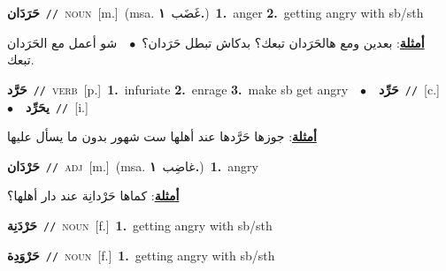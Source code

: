 \documentclass[10pt,a4paper,twoside]{article} %
\begin{document}
\begin{multicols}{2}
{\setlength\topsep{0pt}\textbf{\foreignlanguage{arabic}{حَرَدَان}}\ {\color{gray}\texttt{//}\color{black}}\ \textsc{noun}\ [m.]\ \color{gray}(msa. \foreignlanguage{arabic}{غَضَب}~\foreignlanguage{arabic}{\textbf{١.}})\color{black}\ \textbf{1.}~anger  \textbf{2.}~getting angry with sb/sth\  \begin{flushright}\color{gray}\foreignlanguage{arabic}{\textbf{\underline{\foreignlanguage{arabic}{أمثلة}}}: بعدين ومع هالحَرَدان تبعك؟ بدكاش تبطل حَرَدان؟\ $\bullet$\ \  شو أعمل مع الحَرَدان تبعك.}\end{flushright}\color{black}} \vspace{2mm}

{\setlength\topsep{0pt}\textbf{\foreignlanguage{arabic}{حَرَّد}}\ {\color{gray}\texttt{//}\color{black}}\ \textsc{verb}\ [p.]\ \textbf{1.}~infuriate  \textbf{2.}~enrage  \textbf{3.}~make sb get angry\ \ $\bullet$\ \ \setlength\topsep{0pt}\textbf{\foreignlanguage{arabic}{حَرِّد}}\ {\color{gray}\texttt{//}\color{black}}\ [c.]\ \ $\bullet$\ \ \setlength\topsep{0pt}\textbf{\foreignlanguage{arabic}{يحَرِّد}}\ {\color{gray}\texttt{//}\color{black}}\ [i.]\  \begin{flushright}\color{gray}\foreignlanguage{arabic}{\textbf{\underline{\foreignlanguage{arabic}{أمثلة}}}: جوزها حَرَّدها عند أهلها ست شهور بدون ما يسأل عليها}\end{flushright}\color{black}} \vspace{2mm}

{\setlength\topsep{0pt}\textbf{\foreignlanguage{arabic}{حَرْدَان}}\ {\color{gray}\texttt{//}\color{black}}\ \textsc{adj}\ [m.]\ \color{gray}(msa. \foreignlanguage{arabic}{غاضِب}~\foreignlanguage{arabic}{\textbf{١.}})\color{black}\ \textbf{1.}~angry\  \begin{flushright}\color{gray}\foreignlanguage{arabic}{\textbf{\underline{\foreignlanguage{arabic}{أمثلة}}}: كماها حَرْدانِة عند دار أهلها؟}\end{flushright}\color{black}} \vspace{2mm}

{\setlength\topsep{0pt}\textbf{\foreignlanguage{arabic}{حَرْدَنِة}}\ {\color{gray}\texttt{//}\color{black}}\ \textsc{noun}\ [f.]\ \textbf{1.}~getting angry with sb/sth\ } \vspace{2mm}

{\setlength\topsep{0pt}\textbf{\foreignlanguage{arabic}{حَرْوَدِة}}\ {\color{gray}\texttt{//}\color{black}}\ \textsc{noun}\ [f.]\ \textbf{1.}~getting angry with sb/sth\ } \vspace{2mm}


\end{multicols}
\end{document}
